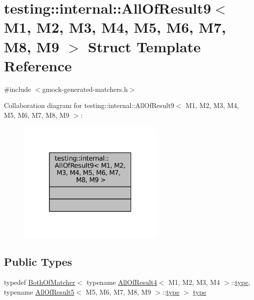 \hypertarget{structtesting_1_1internal_1_1AllOfResult9}{}\section{testing\+:\+:internal\+:\+:All\+Of\+Result9$<$ M1, M2, M3, M4, M5, M6, M7, M8, M9 $>$ Struct Template Reference}
\label{structtesting_1_1internal_1_1AllOfResult9}


{\ttfamily \#include $<$gmock-\/generated-\/matchers.\+h$>$}



Collaboration diagram for testing\+:\+:internal\+:\+:All\+Of\+Result9$<$ M1, M2, M3, M4, M5, M6, M7, M8, M9 $>$\+:
\nopagebreak
\begin{figure}[H]
\begin{center}
\leavevmode
\includegraphics[width=205pt]{structtesting_1_1internal_1_1AllOfResult9__coll__graph}
\end{center}
\end{figure}
\subsection*{Public Types}
\begin{DoxyCompactItemize}
\item 
typedef \hyperlink{classtesting_1_1internal_1_1BothOfMatcher}{Both\+Of\+Matcher}$<$ typename \hyperlink{structtesting_1_1internal_1_1AllOfResult4}{All\+Of\+Result4}$<$ M1, M2, M3, M4 $>$\+::\hyperlink{structtesting_1_1internal_1_1AllOfResult9_ade56e18d2e0b745968b87fc394710edc}{type}, typename \hyperlink{structtesting_1_1internal_1_1AllOfResult5}{All\+Of\+Result5}$<$ M5, M6, M7, M8, M9 $>$\+::\hyperlink{structtesting_1_1internal_1_1AllOfResult9_ade56e18d2e0b745968b87fc394710edc}{type} $>$ \hyperlink{structtesting_1_1internal_1_1AllOfResult9_ade56e18d2e0b745968b87fc394710edc}{type}
\end{DoxyCompactItemize}



